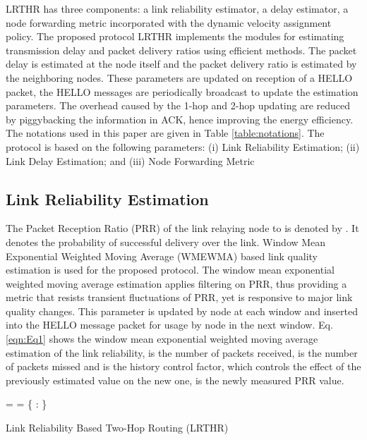 \documentclass[fleqn,twoside]{article}
\begin{document}
LRTHR has three components: a link reliability estimator, a delay estimator, a node forwarding metric incorporated with the 
dynamic velocity assignment policy. The proposed protocol LRTHR implements the modules for estimating transmission delay and packet delivery ratios using efficient methods. The packet delay is estimated at the node itself and the packet delivery ratio is estimated by the neighboring nodes. These parameters are updated on reception of a HELLO packet, the HELLO messages are periodically broadcast to update the estimation parameters. The overhead caused by the 1-hop and 2-hop updating are reduced by piggybacking the information 
in ACK, hence improving the energy efficiency. The notations used in this paper are given in Table \ref{table:notations}. The protocol is based on the following parameters: (i) Link Reliability Estimation; (ii) Link Delay Estimation; and (iii) Node Forwarding Metric


\subsection{Link Reliability Estimation}
The Packet Reception Ratio (PRR) of the link relaying node  to  is denoted by . It denotes the probability of successful 
delivery over the link. Window Mean Exponential Weighted Moving Average (WMEWMA) based link quality estimation is used for the proposed protocol. The window mean exponential weighted moving average estimation applies filtering on PRR, thus providing a metric that resists transient fluctuations of PRR, yet is responsive to major link quality changes.
\vskip 2mm
This parameter is updated by node  at each window and inserted into the HELLO message packet for usage by node  in the next window. 
Eq. \ref{eqn:Eq1} shows the window mean exponential weighted moving average estimation of the link reliability,  is the number of packets received,  is the number of packets missed and  is the history control factor, which controls the effect of the previously estimated value on the new one,  is the newly measured PRR value.

\begin{algorithm}
\begin{footnotesize}
\KwIn{, , , , }
\BlankLine


 =  \;
 = \{ : \} \;
	\Return   \;
\caption{Link Reliability Based Two-Hop Routing (LRTHR)}
\label{algo:lr2halgo}
\end{footnotesize}
\end{algorithm}
\end{document}
